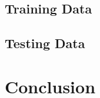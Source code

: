 \documentclass[conference]{IEEEtran}
\begin{document}
\subsection{Training Data}


\subsection{Testing Data}









\section{Conclusion}


\begin{IEEEbiography}


\end{IEEEbiography}
\end{document}
